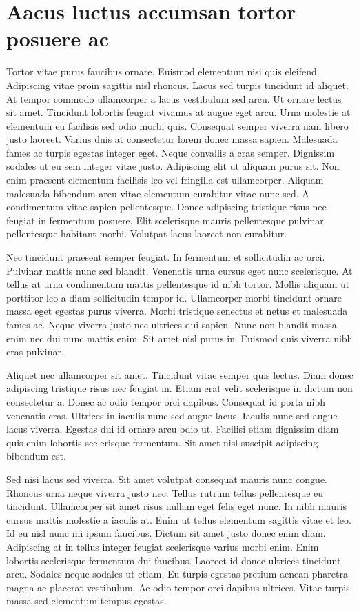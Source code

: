 \documentclass[uplatex, english, twocolumn]{jsarticle}
\begin{document}
\section{Aacus luctus accumsan tortor posuere ac}

Tortor vitae purus faucibus ornare. Euismod elementum nisi quis eleifend. Adipiscing vitae proin sagittis nisl rhoncus. Lacus sed turpis tincidunt id aliquet. At tempor commodo ullamcorper a lacus vestibulum sed arcu. Ut ornare lectus sit amet. Tincidunt lobortis feugiat vivamus at augue eget arcu. Urna molestie at elementum eu facilisis sed odio morbi quis. Consequat semper viverra nam libero justo laoreet. Varius duis at consectetur lorem donec massa sapien. Malesuada fames ac turpis egestas integer eget. Neque convallis a cras semper. Dignissim sodales ut eu sem integer vitae justo. Adipiscing elit ut aliquam purus sit. Non enim praesent elementum facilisis leo vel fringilla est ullamcorper. Aliquam malesuada bibendum arcu vitae elementum curabitur vitae nunc sed. A condimentum vitae sapien pellentesque. Donec adipiscing tristique risus nec feugiat in fermentum posuere. Elit scelerisque mauris pellentesque pulvinar pellentesque habitant morbi. Volutpat lacus laoreet non curabitur.

Nec tincidunt praesent semper feugiat. In fermentum et sollicitudin ac orci. Pulvinar mattis nunc sed blandit. Venenatis urna cursus eget nunc scelerisque. At tellus at urna condimentum mattis pellentesque id nibh tortor. Mollis aliquam ut porttitor leo a diam sollicitudin tempor id. Ullamcorper morbi tincidunt ornare massa eget egestas purus viverra. Morbi tristique senectus et netus et malesuada fames ac. Neque viverra justo nec ultrices dui sapien. Nunc non blandit massa enim nec dui nunc mattis enim. Sit amet nisl purus in. Euismod quis viverra nibh cras pulvinar.

Aliquet nec ullamcorper sit amet. Tincidunt vitae semper quis lectus. Diam donec adipiscing tristique risus nec feugiat in. Etiam erat velit scelerisque in dictum non consectetur a. Donec ac odio tempor orci dapibus. Consequat id porta nibh venenatis cras. Ultrices in iaculis nunc sed augue lacus. Iaculis nunc sed augue lacus viverra. Egestas dui id ornare arcu odio ut. Facilisi etiam dignissim diam quis enim lobortis scelerisque fermentum. Sit amet nisl suscipit adipiscing bibendum est.

Sed nisi lacus sed viverra. Sit amet volutpat consequat mauris nunc congue. Rhoncus urna neque viverra justo nec. Tellus rutrum tellus pellentesque eu tincidunt. Ullamcorper sit amet risus nullam eget felis eget nunc. In nibh mauris cursus mattis molestie a iaculis at. Enim ut tellus elementum sagittis vitae et leo. Id eu nisl nunc mi ipsum faucibus. Dictum sit amet justo donec enim diam. Adipiscing at in tellus integer feugiat scelerisque varius morbi enim. Enim lobortis scelerisque fermentum dui faucibus. Laoreet id donec ultrices tincidunt arcu. Sodales neque sodales ut etiam. Eu turpis egestas pretium aenean pharetra magna ac placerat vestibulum. Ac odio tempor orci dapibus ultrices. Vitae turpis massa sed elementum tempus egestas.
\end{document}
